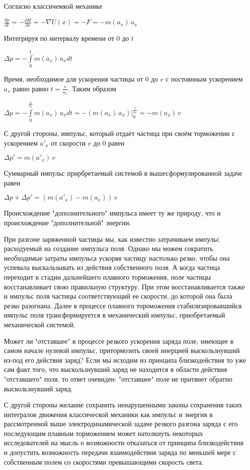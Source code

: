 \documentclass{article}
\begin{document}
Согласно классичемкой механике

$\frac{dp}{dt} = - \frac{\partial H}{\partial x} = - \nabla U(x) = -F = - m(a_x) \, a_x$

Интегрируя по интервалу времени от $0$ до $t$

$\Delta p = - \int\limits_{0}^{t} m(a_x) \, a_x dt$

Время, необходимое для ускорения частицы от $0$ до $v$ с постоянным ускорением $a_x$ равно равно $t = \frac{v}{a_x}$. Таким образом


$\Delta p = - \int\limits_{0}^{\frac{v}{a_x}} m(a_x) \, a_x dt = -\left(m(a_x) \, a_x\right)\Big|_{0}^{\frac{v}{a_x}} = - m(a_x)\,v$

С другой стороны, импульс, который отдаёт частица при своём торможении с ускорением $a'_x$ от скорости $v$ до $0$ равен

$\Delta p' = m(a'_x)\,v$

Суммарный импульс прирбретаемый системой в вышесформулированной задаче равен

$\Delta p + \Delta p' = \left(m(a'_x) - m(a_x)\right)\,v$

Происхождение "дополнительного" импульса имеет ту же природу, что и происхождение "дополнительной" энергии.

При разгоне заряженной частицы мы, как известно затрачиваем импульс расходуемый на создание импульса поля. Однако мы можем сократить необходимые затраты импульса ускоряя частицу настолько резко, чтобы она успевала выскальзывать из действия собственного поля. А когда частица переходит к стадии дальнейшего плавного торможения, поле частицы восстанавливает свою правильную структуру. При этом восстанавливается также и импульс поля частицы соответствующий ее скорости, до которой она была резко разогнана. Далее в процессе плавного тороможения стабилизировавшийся импульс поля трансформируется в механический импульс, приобретаемый механической системой.

Может ли "отставшее" в процессе резкого ускорения заряда поле, имеющее в самом начале нулевой импульс, притормозить своей инерцией выскользнувший из-под его действия заряд? Если мы исходим из принципа близкодействия то уже сам факт того, что выскользнувший заряд не находится в области действия "отставшего" поля, то ответ очевиден: "отставшее" поле не притянет обратно выскользнувший заряд.

С другой стороны желание сохранить ненарушенными законы сохранения таких интегралов движения классической механики как импульс и энергия в рассмотренной выше электродинамической задаче резкого разгона заряда с его последующим плавным торможением может натолкнуть некоторых исследователей на мысль о возможности отказаться от принципа близкодействия и допустить возможность передачи взаимодействия заряда по меньшей мере с собственным полем со скоростями превышающими скорость света.
\end{document}
